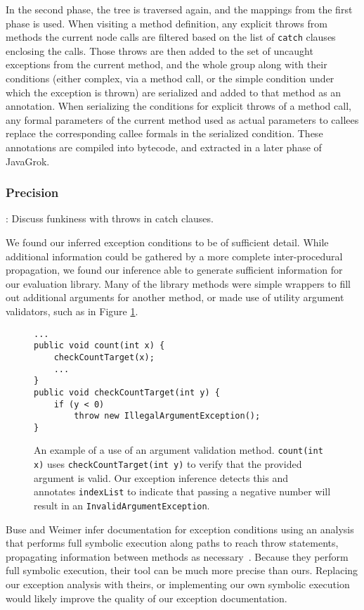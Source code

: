 In the second phase, the tree is traversed again, and the mappings from the first
phase is used.  When visiting a method definition, any explicit throws from
methods the current node calls are filtered based on the list of \texttt{catch} clauses
enclosing the calls.  Those throws are then added to the set of uncaught
exceptions from the current method, and the whole group along with their
conditions (either complex, via a method call, or the simple condition under
which the exception is thrown) are serialized and added to that method as an
annotation.  When serializing the conditions for explicit throws of a method
call, any formal parameters of the current method used as actual parameters to
callees replace the corresponding callee formals in the serialized condition.
These annotations are compiled into bytecode, and extracted in a later phase of
JavaGrok.

\subsubsection{Precision}
{\LARGE: Discuss funkiness with throws in catch clauses.}

We found our inferred exception conditions to be of sufficient detail.  While
additional information could be gathered by a more complete inter-procedural
propagation, we found our inference able to generate sufficient information for
our evaluation library.  Many of the library methods were simple wrappers to
fill out additional arguments for another method, or made use of utility
argument validators, such as in Figure \ref{fig:argvalidate}.

\begin{figure}
\begin{verbatim}
...
public void count(int x) {
    checkCountTarget(x);
    ...
}
public void checkCountTarget(int y) {
    if (y < 0)
        throw new IllegalArgumentException();
}
\end{verbatim}
\caption{An example of a use of an argument validation method.
\texttt{count(int x)} uses \texttt{checkCountTarget(int y)} to verify that the
provided argument is valid.  Our exception inference detects this and annotates
\texttt{indexList} to indicate that passing a negative number will result in an
\texttt{InvalidArgumentException}.}
\label{fig:argvalidate}
\end{figure}

Buse and Weimer infer documentation for exception conditions
using an analysis that performs full symbolic execution along paths to reach throw
statements, propagating information between methods as necessary~\cite{autodoc}.
Because they
perform full symbolic execution, their tool can be much more precise than ours.
Replacing our exception analysis with theirs, or implementing our own symbolic
execution would likely improve the quality of our exception documentation.  

